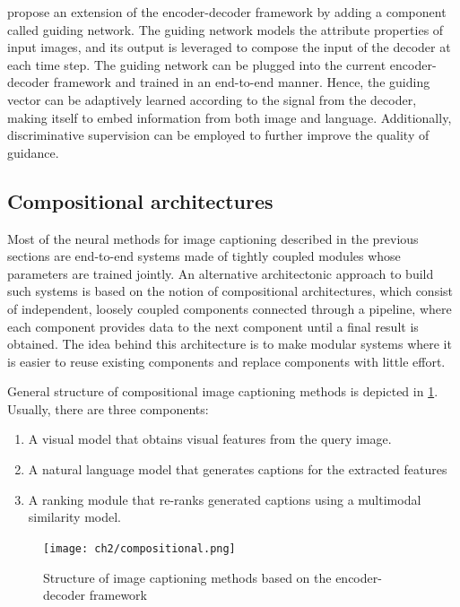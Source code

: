 \citet{Jiang2018} propose an extension of the encoder-decoder framework by adding a component called guiding network. The guiding network models the attribute properties of input images, and its output is leveraged to compose the input of the decoder at each time step. The guiding network can be plugged into the current encoder-decoder framework and trained in an end-to-end manner. Hence, the guiding vector can be adaptively learned according to the signal from the decoder, making itself to embed information from both image and language. Additionally, discriminative supervision can be employed to further improve the quality of guidance.

\subsection{Compositional architectures}\label{subsec:compositional_architectures}

Most of the neural methods for image captioning described in the previous sections are end-to-end systems made of tightly coupled modules whose parameters are trained jointly. An alternative architectonic approach to build such systems is based on the notion of compositional architectures, which consist of independent, loosely coupled components connected through a pipeline, where each component provides data to the next component until a final result is obtained. The idea behind this architecture is to make modular systems where it is easier to reuse existing components and replace components with little effort.

General structure of compositional image captioning methods is depicted in \cref{fig:compositional}. Usually, there are three components: 
\begin{enumerate}
\item A visual model that obtains visual features from the query image.
\item A natural language model that generates captions for the extracted features
\item A ranking module that re-ranks generated captions using a multimodal similarity model.
\end{enumerate}

\begin{figure}[hpt]
	\centering
	\texttt{[image: ch2/compositional.png]}
	\caption{Structure of image captioning methods based on the encoder-decoder framework}
	\label{fig:compositional}
\end{figure}

